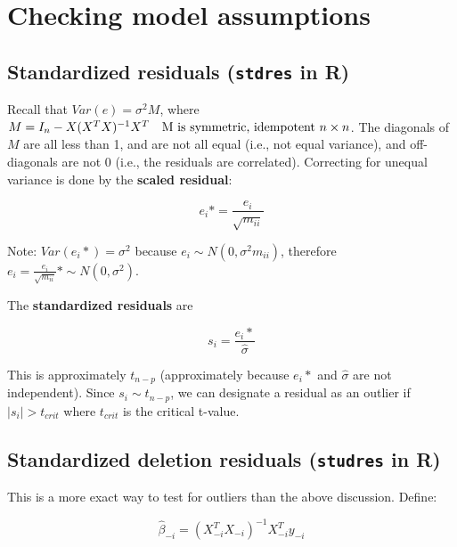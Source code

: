 

\section{Checking model assumptions}

\subsection{Standardized residuals (\texttt{stdres} in R)}

Recall that $Var(e)=\sigma^2 M$, where $M = I_n -  X (X^T X)^{-1} X^T \quad \hbox{M is symmetric, idempotent } n\times n$. The diagonals of $M$ are all less than 1, and are not all equal (i.e., not equal variance), and off-diagonals are not 0 (i.e., the residuals are correlated). Correcting for unequal variance is done by the \textbf{scaled residual}:

\begin{equation}
e_i* = \frac{e_i}{\sqrt{m_{ii}}}
\end{equation}

Note: $Var(e_i*) = \sigma^2$ because $e_i \sim N(0,\sigma^2 m_{ii})$, therefore $e_i=\frac{e_i}{\sqrt{m_{ii}}}*\sim N(0,\sigma^2)$. 


The \textbf{standardized residuals} are 

\begin{equation}
s_i = \frac{e_i*}{\hat{\sigma}}
\end{equation}

This is approximately $t_{n-p}$ (approximately because $e_i*$ and  $\hat{\sigma}$ are not independent).
Since $s_i\sim t_{n-p}$, we can designate a residual as an outlier if $\mid s_i \mid > t_{crit}$ where $t_{crit}$ is the critical t-value.

\subsection{Standardized deletion residuals (\texttt{studres} in R)}

This is a more exact way to test for outliers than the above discussion. Define:

\begin{equation}
\hat{\beta}_{-i} = (X_{-i}^T X_{-i})^{-1} X_{-i}^T y_{-i}
\end{equation}

